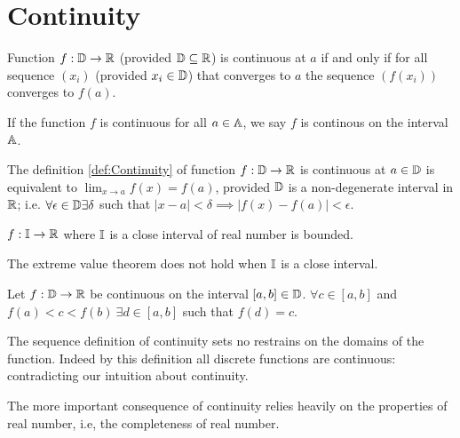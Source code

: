 \documentclass[../note.tex]{subfiles}
\begin{document}
\section{Continuity}

\begin{definition}\label{def:Continuity}
	Function $f: \mathbb{D} \rightarrow \mathbb{R}$ (provided $\mathbb{D} \subseteq \mathbb{R}$) is continuous at $a$
	if and only if for all sequence $(x_i)$ (provided $x_i \in \mathbb{D}$) that converges to $a$ the sequence $(f(x_i))$ converges to $f(a)$.

	If the function $f$ is continuous for all $a \in \mathbb{A}$, we say $f$ is continous on the interval $\mathbb{A}$.
\end{definition}

\begin{theorem}
	The definition \ref{def:Continuity} of function $f:\mathbb{D} \rightarrow \mathbb{R}$ is continuous at $a\in \mathbb{D}$ is equivalent to $\lim _{x\to a}f(x) = f(a)$, provided $\mathbb{D}$ is a non-degenerate interval in $\mathbb{R}$; 
	i.e. $\forall \epsilon \in \mathbb{D} \exists \delta $ such that $|x-a| < \delta \implies |f(x)-f(a)| < \epsilon$.
\end{theorem}

\begin{definition}
	$f:\mathbb{I} \rightarrow \mathbb{R}$ where $\mathbb{I}$ is a close interval of real number is bounded.
\end{definition}

\begin{remark}
	The extreme value theorem does not hold when $\mathbb{I}$ is a close interval. 
\end{remark}

\begin{theorem}
	Let $f: \mathbb{D} \rightarrow \mathbb{R}$ be continuous on the interval $[a,b]\in \mathbb{D}$. $\forall c\in [a, b]$ and $f(a)<c<f(b)\ \exists d \in [a,b] $ such that $ f(d) = c$.  
\end{theorem}

\begin{remark}

	The sequence definition of continuity sets no restrains on the domains of the function. Indeed by this definition all discrete functions are continuous: contradicting our intuition about continuity.
	
	The more important consequence of continuity relies heavily on the properties of real number, i.e, the completeness of real number.
\end{remark}
\end{document}
